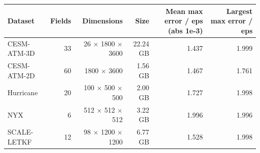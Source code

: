 \begin{tabular}{lrrrrr}
\toprule
\textbf{Dataset} & \textbf{Fields} & \textbf{Dimensions} & \textbf{Size} & \textbf{Mean max error / eps (abs 1e-3)} & \textbf{Largest max error / eps} \\
\midrule
CESM-ATM-3D & 33 & 26 $\times$ 1800 $\times$ 3600 & 22.24 GB & 1.437 & 1.999 \\
CESM-ATM-2D & 60 & 1800 $\times$ 3600 & 1.56 GB & 1.467 & 1.761 \\
Hurricane & 20 & 100 $\times$ 500 $\times$ 500 & 2.00 GB & 1.727 & 1.998 \\
NYX & 6 & 512 $\times$ 512 $\times$ 512 & 3.22 GB & 1.996 & 1.996 \\
SCALE-LETKF & 12 & 98 $\times$ 1200 $\times$ 1200 & 6.77 GB & 1.528 & 1.998 \\
\bottomrule
\end{tabular}

